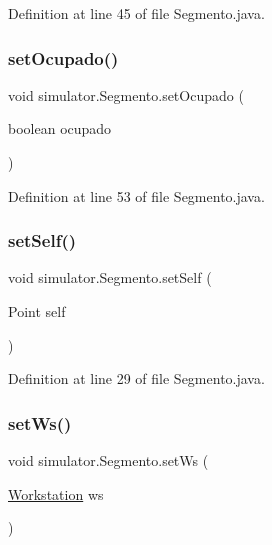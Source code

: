Definition at line 45 of file Segmento.\+java.

\mbox{\label{classsimulator_1_1_segmento_a3b8d3958f5ae252c1a9ee2f015040004}} 
\subsubsection{\texorpdfstring{set\+Ocupado()}{setOcupado()}}
{\footnotesize\ttfamily void simulator.\+Segmento.\+set\+Ocupado (\begin{DoxyParamCaption}\item[{boolean}]{ocupado }\end{DoxyParamCaption})}



Definition at line 53 of file Segmento.\+java.

\mbox{\label{classsimulator_1_1_segmento_acc6bd49b531123d4237b514521612840}} 
\subsubsection{\texorpdfstring{set\+Self()}{setSelf()}}
{\footnotesize\ttfamily void simulator.\+Segmento.\+set\+Self (\begin{DoxyParamCaption}\item[{Point}]{self }\end{DoxyParamCaption})}



Definition at line 29 of file Segmento.\+java.

\mbox{\label{classsimulator_1_1_segmento_a87bee1b2574d78489fb898eff6b45245}} 
\subsubsection{\texorpdfstring{set\+Ws()}{setWs()}}
{\footnotesize\ttfamily void simulator.\+Segmento.\+set\+Ws (\begin{DoxyParamCaption}\item[{\mbox{\hyperlink{classsimulator_1_1_workstation}{Workstation}}}]{ws }\end{DoxyParamCaption})}



